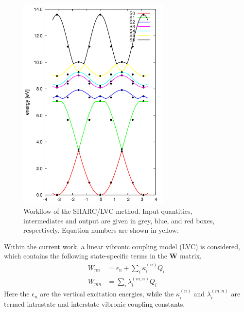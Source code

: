 \documentclass[twoside,twocolumn,9pt]{article}
\begin{document}
%
\begin{figure}
\includegraphics[width=3in]{torsion}
\caption{Workflow of the SHARC/LVC method. Input quantities, intermediates and output are given in grey, blue, and red boxes, respectively. Equation numbers are shown in yellow.}
\label{fig:flow}
\end{figure}
Within the current work, a linear vibronic coupling model (LVC) is considered, which contains the following state-specific terms in the $\mathbf{W}$ matrix.
%
\begin{align}
\label{eq:Wnn}
W_{nn}&=\epsilon_n + \sum_i\kappa_i^{(n)}Q_i\\
\label{eq:Wmn}
W_{mn}&=\sum_i\lambda_i^{(m,n)}Q_i
\end{align}
%
Here the $\epsilon_n$ are the vertical excitation energies, while the $\kappa_i^{(n)}$ and $\lambda_i^{(m,n)}$ are termed intrastate and interstate vibronic coupling constants.\cite{Koppel1984}
\end{document}
